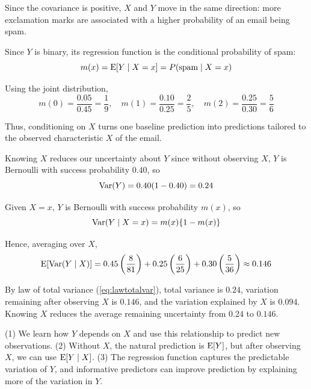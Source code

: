 \begin{example}
Since the covariance is positive, $X$ and $Y$ move in the same direction: more exclamation marks are associated with a higher probability of an email being spam.

Since $Y$ is binary, its regression function is the conditional probability of spam:
\begin{equation*}
    m(x)=\operatorname{E}[Y \mid X =x] = P(\text{spam} \mid X = x)
\end{equation*}

Using the joint distribution,
\begin{equation*}
    m(0)=\frac{0.05}{0.45}=\frac{1}{9}, \quad m(1)=\frac{0.10}{0.25}=\frac{2}{5}, \quad m(2)=\frac{0.25}{0.30}=\frac{5}{6}
\end{equation*}

Thus, conditioning on $X$ turns one baseline prediction into predictions tailored to the observed characteristic $X$ of the email. 

Knowing $X$ reduces our uncertainty about $Y$ since without observing $X$, $Y$ is Bernoulli with success probability $0.40$, so 
\begin{equation*}
    \operatorname{Var}(Y)=0.40(1-0.40)=0.24
\end{equation*}

Given $X=x$, $Y$ is Bernoulli with success probability $m(x)$, so
\begin{equation*}
    \operatorname{Var}(Y \mid X=x)=m(x)\{1-m(x)\}
\end{equation*}

Hence, averaging over $X$,
\begin{equation*}
    \operatorname{E}[\operatorname{Var}(Y \mid X)] = 0.45 \left( \frac{8}{81} \right) + 0.25 \left( \frac{6}{25} \right) + 0.30 \left( \frac{5}{36} \right) \approx 0.146
\end{equation*}

By law of total variance (\ref{eq:lawtotalvar}), total variance is $0.24$, variation remaining after observing $X$ is $0.146$, and the variation explained by $X$ is $0.094$. Knowing $X$ reduces the average remaining uncertainty from $0.24$ to $0.146$.

\begin{remark}
    (1) We learn how $Y$ depends on $X$ and use this relationship to predict new observations. (2) Without $X$, the natural prediction is $\operatorname{E}[Y]$, but after observing $X$, we can use $\operatorname{E}[Y \mid X]$. (3) The regression function captures the predictable variation of $Y$, and informative predictors can improve prediction by explaining more of the variation in $Y$.
\end{remark}
\end{example}

